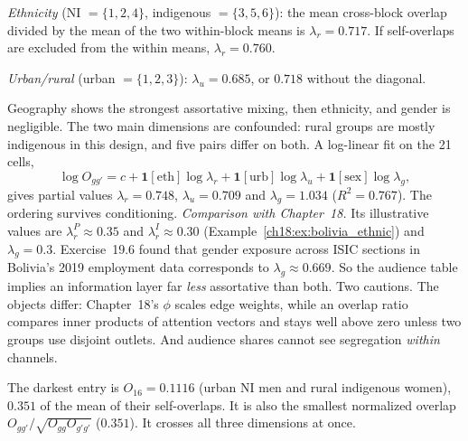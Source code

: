 \documentclass[../solutions_manual.tex]{subfiles}
\begin{document}
 \emph{Ethnicity} (NI $= \{1, 2, 4\}$, indigenous $= \{3, 5, 6\}$): the mean cross-block overlap divided by the mean of the two within-block means is $\lambda_r = 0.717$. If self-overlaps are excluded from the within means, $\lambda_r = 0.760$.

 \emph{Urban/rural} (urban $= \{1, 2, 3\}$): $\lambda_u = 0.685$, or $0.718$ without the diagonal.

 Geography shows the strongest assortative mixing, then ethnicity, and gender is negligible. The two main dimensions are confounded: rural groups are mostly indigenous in this design, and five pairs differ on both. A log-linear fit on the 21 cells,
\[
\log O_{gg'} = c + \mathbf 1[\text{eth}]\log\lambda_r + \mathbf 1[\text{urb}]\log\lambda_u + \mathbf 1[\text{sex}]\log\lambda_g,
\]
gives partial values $\lambda_r = 0.748$, $\lambda_u = 0.709$ and $\lambda_g = 1.034$ ($R^2 = 0.767$). The ordering survives conditioning. \emph{Comparison with Chapter~18.} Its illustrative values are $\lambda_r^P \approx 0.35$ and $\lambda_r^I \approx 0.30$ (Example~\ref{ch18:ex:bolivia_ethnic}) and $\lambda_g = 0.3$. Exercise~19.6 found that gender exposure across ISIC sections in Bolivia's 2019 employment data corresponds to $\lambda_g \approx 0.669$. So the audience table implies an information layer far \emph{less} assortative than both. Two cautions. The objects differ: Chapter~18's $\phi$ scales edge weights, while an overlap ratio compares inner products of attention vectors and stays well above zero unless two groups use disjoint outlets. And audience shares cannot see segregation \emph{within} channels.


 The darkest entry is $O_{16} = 0.1116$ (urban NI men and rural indigenous women), $0.351$ of the mean of their self-overlaps. It is also the smallest normalized overlap $O_{gg'}/\sqrt{O_{gg}O_{g'g'}}$ ($0.351$). It crosses all three dimensions at once.
\end{document}

